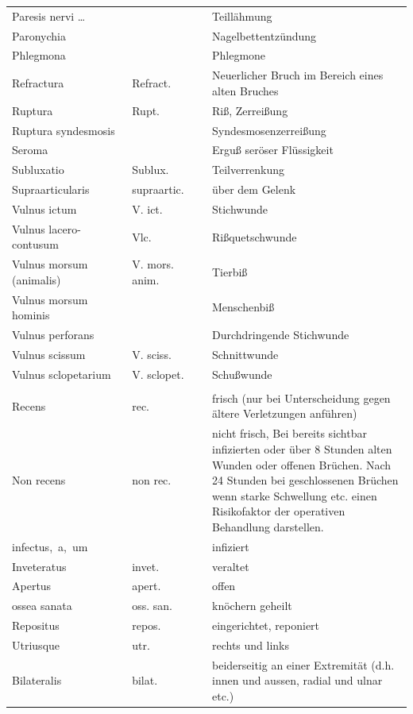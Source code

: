 \documentclass[
ngerman,
paper=a4,
asymmetric,
fontsize=10pt,
headings=small,
draft=false,
numbers=noenddot,
bibtotocnumbered,
footnotes=multiple,
]{scrreprt}
\begin{document}
\begin{enumerate}
{\begin{longtable}{p{0.3\linewidth}p{0.2\linewidth}p{0.5\linewidth}}
\\
Paresis nervi \ldots  & &	Teillähmung
\\
Paronychia  & &	Nagelbettentzündung
\\\addlinespace
Phlegmona  & &	Phlegmone
\\
Refractura  & Refract. &	Neuerlicher Bruch im Bereich eines alten Bruches
\\
Ruptura  & Rupt. &	Riß, Zerreißung
\\
Ruptura syndesmosis & &	Syndesmosenzerreißung
\\\addlinespace
Seroma  & &	Erguß seröser Flüssigkeit
\\
Subluxatio  & Sublux. &	Teilverrenkung
\\
Supraarticularis  & supraartic. &	über dem Gelenk
\\\addlinespace
Vulnus ictum  & V. ict. &	Stichwunde
\\
Vulnus lacero-contusum  & Vlc. &	Rißquetschwunde
\\
Vulnus morsum (animalis) & V. mors. anim. &	Tierbiß
\\
Vulnus morsum hominis  & &	Menschenbiß
\\
Vulnus perforans  & &	Durchdringende Stichwunde
\\
Vulnus scissum  & V. sciss. &	Schnittwunde
\\
Vulnus sclopetarium  & V. sclopet. &	Schußwunde
\\\addlinespace\midrule\addlinespace
\multicolumn{3}{c}{{\TabSub{Zusätze}}}
\\\addlinespace\midrule\addlinespace
Recens  &  rec. &	frisch (nur bei Unterscheidung gegen ältere Verletzungen anführen)
\\
Non recens  & non rec. &	nicht frisch, Bei bereits sichtbar infizierten oder über 8 Stunden alten Wunden oder offenen Brüchen. Nach 24 Stunden bei geschlossenen Brüchen wenn starke Schwellung etc. einen Risikofaktor der operativen Behandlung darstellen.
\\
infectus,~a,~um  & &	infiziert
\\
Inveteratus  & invet. &	veraltet
\\
Apertus  & apert. &	offen
\\
ossea sanata  & oss. san. &	knöchern geheilt
\\
Repositus  & repos. &	eingerichtet, reponiert
\\
Utriusque  & utr. &	rechts und links
\\
Bilateralis  & bilat. &	beiderseitig an einer Extremität (d.h. innen und aussen, radial und ulnar etc.)

\end{longtable}}
\end{enumerate}
\end{document}
